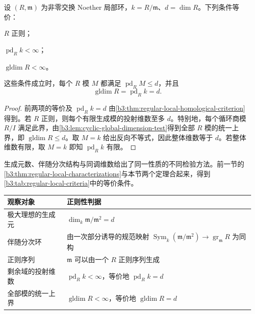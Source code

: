 \begin{theorem}[整体维数刻画]\label{b3:thm:regular-local-global-dimension}
	设 \((R,\mathfrak m)\) 为非零交换 Noether 局部环，\(k=R/\mathfrak m\)、\(d=\dim R\)。下列条件等价：
	\begin{equivalences}
		\item \(R\) 正则；
		\item \(\operatorname{pd}_Rk<\infty\)；
		\item \(\operatorname{gldim}R<\infty\)。
	\end{equivalences}
	这些条件成立时，每个 \(R\) 模 \(M\) 都满足 \(\operatorname{pd}_RM\le d\)，并且
	\[
		\operatorname{gldim}R=\operatorname{pd}_Rk=d.
	\]
\end{theorem}
\begin{proof}
	前两项的等价及 \(\operatorname{pd}_Rk=d\) 由\cref{b3:thm:regular-local-homological-criterion}得到。若 \(R\) 正则，则每个有限生成模的投射维数至多 \(d\)。特别地，每个循环商模 \(R/I\) 满足此界，由\cref{b3:lem:cyclic-global-dimension-test}得到全部 \(R\) 模的统一上界，即 \(\operatorname{gldim}R\le d\)。取 \(M=k\) 给出反向不等式，因此整体维数等于 \(d\)。若整体维数有限，取 \(M=k\) 即知 \(\operatorname{pd}_Rk\) 有限。
\end{proof}

生成元数、伴随分次结构与同调维数给出了同一性质的不同检验方法。前一节的\cref{b3:thm:regular-local-characterizations}与本节两个定理合起来，得到\cref{b3:tab:regular-local-criteria}中的等价条件。

\begin{center}
	\begin{minipage}{\textwidth}
		\makeatletter
		\def\@captype{table}
		\makeatother
		\centering
		\caption[正则局部环的等价条件]{正则局部环的等价条件。设 \((R,\mathfrak m)\) 为非零交换 Noether 局部环，\(k=R/\mathfrak m\)、\(d=\dim R\)。表中所有条件等价，整体维数取遍全部 \(R\) 模。}
		\label{b3:tab:regular-local-criteria}
		\begin{tabularx}{\textwidth}{@{}>{\raggedright\arraybackslash}p{}>{\raggedright\arraybackslash}X@{}}
			\toprule
			观察对象 & 正则性判据\\
			\midrule
			极大理想的生成元 & \(\dim_k\mathfrak m/\mathfrak m^2=d\)\\
			伴随分次环 & 由一次部分诱导的规范映射 \(\operatorname{Sym}_k(\mathfrak m/\mathfrak m^2)\rightarrow\operatorname{gr}_{\mathfrak m}R\) 为同构\\
			正则序列 & \(\mathfrak m\) 可以由一个 \(R\) 正则序列生成\\
			剩余域的投射维数 & \(\operatorname{pd}_Rk<\infty\)，等价地 \(\operatorname{pd}_Rk=d\)\\
			全部模的统一上界 & \(\operatorname{gldim}R<\infty\)，等价地 \(\operatorname{gldim}R=d\)\\
			\bottomrule
		\end{tabularx}
	\end{minipage}
\end{center}

